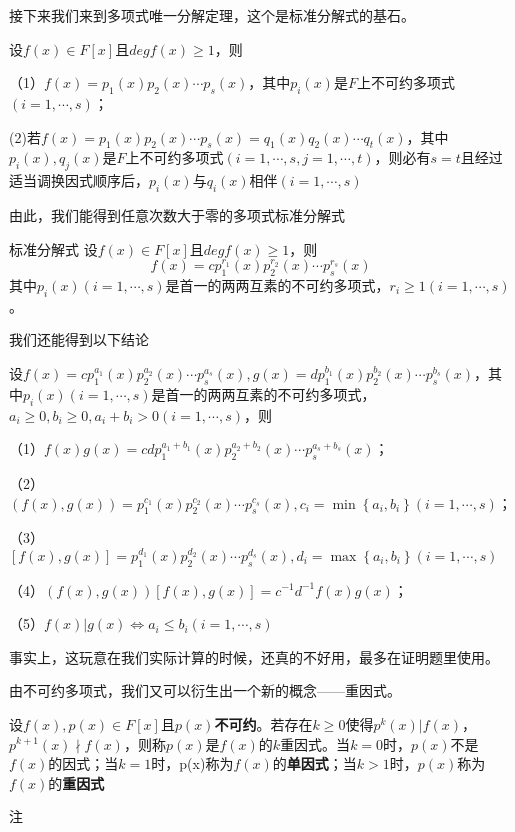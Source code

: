 \documentclass[lang=cn,10pt]{elegantbook}
\begin{document}
接下来我们来到多项式唯一分解定理，这个是标准分解式的基石。
\begin{theorem}[唯一分解定理]
	设$f(x)\in F[x]$且$deg{f}(x)\geq1$，则
	
	（1）$f(x)=p_1(x)p_2(x)\cdots p_s(x)$，其中$p_i(x)$是$F$上不可约多项式$(i=1,\cdots,s)$；
	
	(2)若$f(x)=p_1(x)p_2(x)\cdots p_s(x)=q_1(x)q_2(x)\cdots q_t(x)$，其中$p_i(x),q_j(x)$是$F$上不可约多项式$(i=1,\cdots,s,j=1,\cdots,t)$，则必有$s=t$且经过适当调换因式顺序后，$p_i(x)$与$q_i(x)$相伴$(i=1,\cdots,s)$
\end{theorem}
由此，我们能得到任意次数大于零的多项式标准分解式
\begin{theorem}{标准分解式}
	设$f(x)\in F[x]$且$deg{f}(x)\geq1$，则
	\begin{equation*}
		f(x)=cp_1^{r_1}(x)p_2^{r_2}(x)\cdots p_s^{r_s}(x)
	\end{equation*}
	其中$p_i(x)(i=1,\cdots,s)$是首一的两两互素的不可约多项式，$r_i\geq1(i=1,\cdots,s)$。
\end{theorem}
我们还能得到以下结论
\begin{conclusion}
	设$f(x)=cp_1^{a_1}(x)p_2^{a_2}(x)\cdots p_s^{a_s}(x),g(x)=dp_1^{b_1}(x)p_2^{b_2}(x)\cdots p_s^{b_s}(x)$，其中$p_i(x)(i=1,\cdots,s)$是首一的两两互素的不可约多项式，$a_i\geq0,b_i\geq0,a_i+b_i>0(i=1,\cdots,s)$，则
	
	（1）$f(x)g(x)=cdp_1^{a_1+b_1}(x)p_2^{a_2+b_2}(x)\cdots p_s^{a_s+b_s}(x)$；
	
	（2）$(f(x),g(x))=p_1^{c_1}(x)p_2^{c_2}(x)\cdots p_s^{c_s}(x),c_i=\min \left\{ a_{i},b_{i} \right\} (i=1,\cdots,s)$；
	
	（3）$[f(x),g(x)]=p_{1}^{d_1}(x)p_{2}^{d_2}(x)\cdots p_{s}^{d_s}(x),d_i=\max \left\{ a_i,b_i \right\} (i=1,\cdots ,s)$
	
	（4）$(f(x),g(x))[f(x),g(x)]=c^{-1}d^{-1}f(x)g(x)$；
	
	（5）$f(x)|g(x)\Leftrightarrow a_i\le b_i(i=1,\cdots,s)$
\end{conclusion}
事实上，这玩意在我们实际计算的时候，还真的不好用，最多在证明题里使用。

由不可约多项式，我们又可以衍生出一个新的概念——重因式。

\begin{definition}[重因式]
	设$f(x),p(x)\in F[x]$且$p(x)$\textbf{不可约}。若存在$k\geq0$使得$p^k(x)|f(x)$，$p^{k+1}(x)\nmid f(x)$，则称$p(x)$是$f(x)$的$k$重因式。当$k=0$时，$p(x)$不是$f(x)$的因式；当$k=1$时，p(x)称为$f(x)$的\textbf{单因式}；当$k>1$时，$p(x)$称为$f(x)$的\textbf{重因式}
\end{definition}
注
\end{document}
